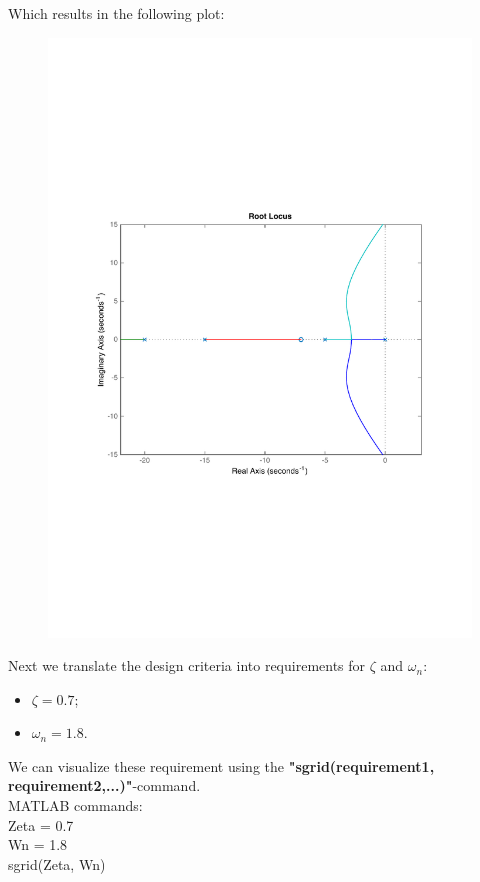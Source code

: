 \begin{frame}
	\begin{exampleblock}{}
		Which results in the following plot:
		\vspace{-0.5em}
		\begin{figure}
			\centering
			\includegraphics[width=0.7\linewidth]{matlab_ex1}
		\end{figure}
	\end{exampleblock}
\end{frame}

\begin{frame}
	\begin{exampleblock}{}
		Next we translate the design criteria into requirements for $\zeta$ and $\omega_n$:
		\begin{itemize}
			\item $\zeta = 0.7$;
			\item $\omega_n = 1.8$.
		\end{itemize}
		\vspace{1em}
		We can visualize these requirement using the \textbf{"sgrid(requirement1, requirement2,...)"}-command.\\
		\vspace{1em}
		MATLAB commands:\\
		Zeta = 0.7\\
		Wn = 1.8\\
		sgrid(Zeta, Wn)\\
	\end{exampleblock}
\end{frame}

